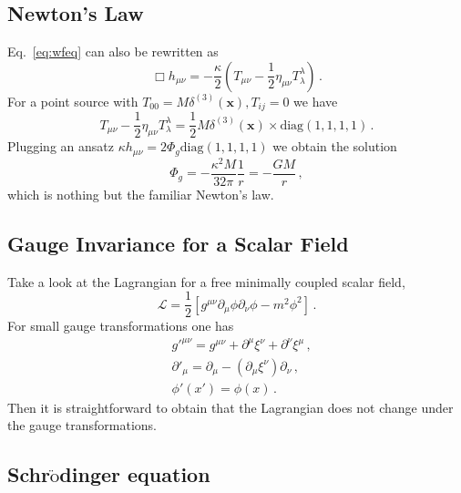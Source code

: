 \documentclass[11pt,a4paper]{article}
\newcommand{\be}{\begin{equation}}
\newcommand{\ee}{\end{equation}}
\newcommand\m{\mu}
\newcommand\n{\nu}
\renewcommand\a{\alpha}
\renewcommand\b{\beta}
\renewcommand\l{\lambda}
\def\d{\partial}
\begin{document}


\subsection{Newton's Law}

Eq.~\eqref{eq:wfeq} can also be rewritten as
\be
\Box h_{\m\n}=-\frac{\kappa}{2}(T_{\m\n}-\frac{1}{2}\eta_{\m\n}T^\l_\l)\,.
\ee
For a point source with $T_{00}=M \delta^{(3)}(\textbf{x}), T_{ij}=0$ we have
\be
T_{\m\n}-\frac{1}{2} \eta_{\m\n}T^\l_\l=\frac{1}{2}M \delta^{(3)}(\textbf{x})\times \text{diag}(1,1,1,1)\,.
\ee
Plugging an ansatz $\kappa h_{\m\n}=2 \Phi_g\text{diag}(1,1,1,1)$ we obtain the solution
\be
\Phi_g=-\frac{\kappa^2 M}{32 \pi}\frac{1}{r}=-\frac{G M}{r}\,,
\ee
which is nothing but the familiar Newton's law.

\subsection{Gauge Invariance for a Scalar Field}

Take a look at the Lagrangian for a free minimally coupled scalar field,
\be
\mathcal{L}=\frac{1}{2}\left[g^{\m\n}\d_\m\phi\d_\n\phi-m^2\phi^2\right]\,.
\ee
For small gauge transformations one has
\be
\begin{split}
& g'^{\mu \nu}= g^{\mu \nu}+\d^\m \xi^\n+\d^\n \xi^\m\,,\\
& \d'_{\mu}= \d_{\mu}-(\d_\m\xi^\n) \d_\n\,,\\
& \phi'(x')=\phi(x)\,.
\end{split}
\ee
Then it is straightforward to obtain that the Lagrangian does not change under  the gauge
transformations.

\subsection{Schr$\ddot{\text{o}}$dinger equation}
\end{document}
